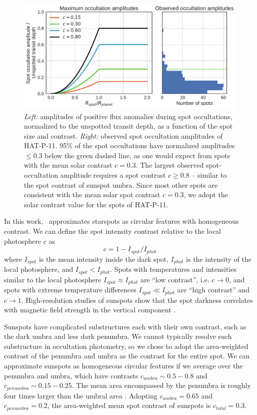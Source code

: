 \begin{figure}
\centering
\includegraphics[scale=0.35]{stsp_hat_p_11/contrasts.pdf}
\caption{\textit{Left:} amplitudes of positive flux anomalies during spot occultations, normalized to the unspotted transit depth, as a function of the spot size and contrast. \textit{Right:} observed spot occultation amplitudes of HAT-P-11. 95\% of the spot occultations have normalized amplitudes $\le 0.3$ below the green dashed line, as one would expect from spots with the mean solar contrast $c=0.3$. The largest observed spot-occultation amplitude requires a spot contrast $c \ge 0.8$ -- similar to the spot contrast of sunspot umbra. Since most other spots are consistent with the mean solar spot contrast $c = 0.3$, we adopt the solar contrast value for the spots of HAT-P-11.}
\label{fig:contrast}
\end{figure}

In this work, \stsp\ approximates starspots as circular features with homogeneous contrast. We can define the spot intensity contrast relative to the local photosphere $c$ as
\begin{equation}
c = 1 - I_{spot}/I_{phot} \label{eqn:contrast}
\end{equation}
where $I_{spot}$ is the mean intensity inside the dark spot, $I_{phot}$ is the intensity of the local photosphere, and $I_{spot} < I_{phot}$. Spots with temperatures and intensities similar to the local photosphere $I_{spot} \approx I_{phot}$ are ``low contrast'', i.e. $c \rightarrow 0$, and spots with extreme temperature differences $I_{spot} \ll I_{phot}$ are ``high contrast'' and $c\rightarrow 1$. High-resolution studies of sunspots show that the spot darkness correlates with magnetic field strength in the vertical component \citep{Keppens1996, Leonard2008}.

Sunspots have complicated substructures each with their own contrast, such as the dark umbra and less dark penumbra. We cannot typically resolve such substructure in occultation photometry, so we chose to adopt the area-weighted contrast of the penumbra and umbra as the contrast for the entire spot. We can approximate sunspots as homogeneous circular features if we average over the penumbra and umbra, which have contrasts $c_{umbra} \sim 0.5 - 0.8$ and $c_{penumbra} \sim 0.15-0.25$. The mean area encompassed by the penumbra is roughly four times larger than the umbral area \citep{Solanki2003}. Adopting $c_{umbra} = 0.65$ and $c_{penumbra} = 0.2$, the area-weighted mean spot contrast of sunspots is $c_{total} = 0.3$. 

